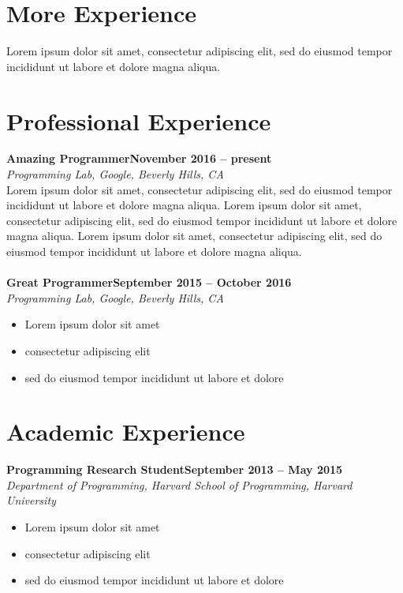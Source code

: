 \documentclass[line,mm]{res} %
\begin{document}
\begin{resume}
\section{\mysidestyle More Experience} 
Lorem ipsum dolor sit amet, consectetur adipiscing elit, sed do eiusmod tempor incididunt ut labore et dolore magna aliqua. 



\section{\mysidestyle Professional Experience} 
\textbf{Amazing Programmer}\hfill \textbf{November 2016 -- present}\\
\textsl{Programming Lab, Google, Beverly Hills, CA } \\%
Lorem ipsum dolor sit amet, consectetur adipiscing elit, sed do eiusmod tempor incididunt ut labore et dolore magna aliqua. Lorem ipsum dolor sit amet, consectetur adipiscing elit, sed do eiusmod tempor incididunt ut labore et dolore magna aliqua. Lorem ipsum dolor sit amet, consectetur adipiscing elit, sed do eiusmod tempor incididunt ut labore et dolore magna aliqua. \\ 
\\
\textbf{Great Programmer}\hfill \textbf{September 2015 -- October 2016}\\
\textsl{Programming Lab, Google, Beverly Hills, CA } \\%
\begin{itemize}
\item Lorem ipsum dolor sit amet
\item consectetur adipiscing elit 
\item sed do eiusmod tempor incididunt ut labore et dolore
\end{itemize}

\section{\mysidestyle Academic Experience} 
\textbf{Programming Research Student}\hfill \textbf{September 2013 -- May 2015}\\
\textsl{\small Department of Programming, Harvard School of Programming, Harvard University} \\%
\begin{itemize}
\item Lorem ipsum dolor sit amet
\item consectetur adipiscing elit 
\item sed do eiusmod tempor incididunt ut labore et dolore
\end{itemize}







\end{resume}
\end{document}
